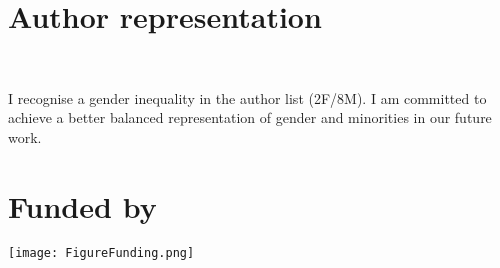 \documentclass[a0,portrait]{a0poster}
\begin{document}
\begin{multicols}{3}


\section*{Author representation}
\begin{minipage}{0.1\linewidth}%
\
\end{minipage}
\begin{minipage}{0.9\linewidth}%
    I recognise a gender inequality in the author list (2F/8M). I am committed to achieve a better balanced representation of gender and minorities in our future work.  
\end{minipage}



\small
\nocite{*} %


\section*{Funded by}
\begin{center}\vspace{0cm}
\texttt{[image: FigureFunding.png]}
\end{center}%


\end{multicols}
\end{document}
